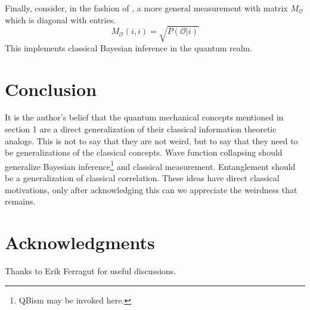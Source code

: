 \documentclass[12pt,a4paper]{article}
\begin{document}
Finally, consider, in the fashion of \cite{nielsenchuang}, a more general measurement with matrix $M_\mathcal{O}$ which is diagonal with entries.
\[
   M_\mathcal{O}(i,i) = \sqrt{P(\mathcal{O} | i)}
\]
This implements classical Bayesian inference in the quantum realm.

\section{Conclusion}

It is the author's belief that the quantum mechanical concepts mentioned in section 1 are a direct generalization of their classical information theoretic analogs.  This is not to say that they are not weird, but to say that they need to be generalizations of the classical concepts.  Wave function collapsing should generalize Bayesian inference\footnote{QBism may be invoked here.} and classical measurement.  Entanglement should be a generalization of classical correlation.  These ideas have direct classical motivations, only after acknowledging this can we appreciate the weirdness that remains.

\section{Acknowledgments}
Thanks to Erik Ferragut for useful discussions.



\end{document}
